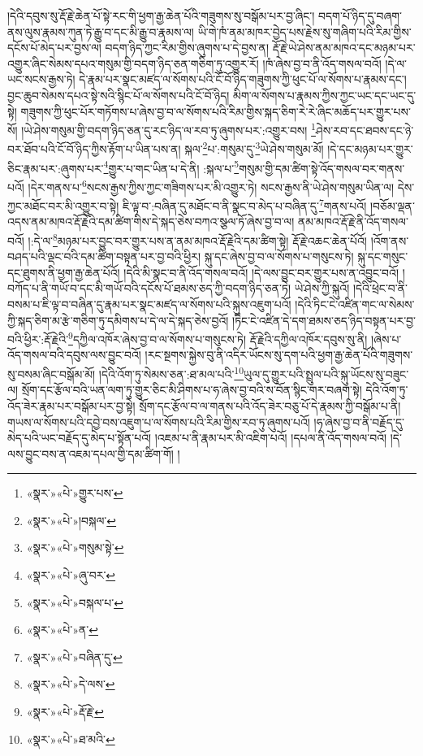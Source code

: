 །དེའི་དབུས་སུ་རྡོ་རྗེ་ཆེན་པོ་སྟེ་རང་གི་ཕྱག་རྒྱ་ཆེན་པོའི་གཟུགས་སུ་བསྒོམ་པར་བྱ་ཞིང་། བདག་པོ་ཉིད་དུ་བཞག་ནས་ལུས་རྣམས་ཀུན་ཏེ་རྒྱུ་བ་དང་མི་རྒྱུ་བ་རྣམས་ལ། ཡི་གེ་ཁཾ་ནམ་མཁར་བྱེད་པས་རྗེས་སུ་གཞིག་པའི་རིམ་གྱིས་དངོས་པོ་མེད་པར་བྱས་ལ། བདག་ཉིད་ཀྱང་རིམ་གྱིས་ཞུགས་པ་དེ་བྱས་ན། རྡོ་རྗེ་ཡེ་ཤེས་ནམ་མཁའ་དང་མཉམ་པར་འགྱུར་ཞིང་སེམས་དཔའ་གསུམ་གྱི་བདག་ཉིད་ཅན་གཅིག་ཏུ་འགྱུར་རོ། །ཁཾ་ཞེས་བྱ་བ་ནི་འོད་གསལ་བའོ། །དེ་ལ་ཡང་སངས་རྒྱས་ཏེ། དེ་རྣམ་པར་སྣང་མཛད་ལ་སོགས་པའི་ངོ་བོ་ཉིད་གཟུགས་ཀྱི་ཕུང་པོ་ལ་སོགས་པ་རྣམས་དང་། བྱང་ཆུབ་སེམས་དཔའ་སྟེ་སའི་སྙིང་པོ་ལ་སོགས་པའི་ངོ་བོ་ཉིད། མིག་ལ་སོགས་པ་རྣམས་ཀྱིས་ཀྱང་ཡང་དང་ཡང་དུ་སྟེ། གཟུགས་ཀྱི་ཕུང་པོར་གཏོགས་པ་ཞེས་བྱ་བ་ལ་སོགས་པའི་རིམ་གྱིས་སྐད་ཅིག་རེ་རེ་ཞིང་མཆོད་པར་གྱུར་པས་སོ། །ཡེ་ཤེས་གསུམ་གྱི་བདག་ཉིད་ཅན་དུ་རང་ཉིད་ལ་རབ་ཏུ་ཞུགས་པར་:འགྱུར་བས། \footnote{«སྣར་»«པེ་»གྱུར་པས་}ཤེས་རབ་དང་ཐབས་དང་ཉེ་བར་ཐོབ་པའི་ངོ་བོ་ཉིད་ཀྱིས་རྟོག་པ་ཡིན་པས་ན། སྐལ་\footnote{«སྣར་»«པེ་»།བསྐལ་}པ་:གསུམ་དུ་\footnote{«སྣར་»«པེ་»གསུམ་སྟེ་}ཡེ་ཤེས་གསུམ་མོ། །དེ་དང་མཉམ་པར་གྱུར་ཅིང་རྣམ་པར་:ཞུགས་པར་\footnote{«སྣར་»«པེ་»ཞུ་བར་}གྱུར་པ་གང་ཡིན་པ་དེ་ནི། :སྐལ་པ་\footnote{«སྣར་»«པེ་»བསྐལ་པ་}གསུམ་གྱི་དམ་ཚིག་སྟེ་འོད་གསལ་བར་གནས་པའོ། །དེར་གནས་པ་\footnote{«སྣར་»«པེ་»ན་}སངས་རྒྱས་ཀྱིས་ཀྱང་གཟིགས་པར་མི་འགྱུར་ཏེ། སངས་རྒྱས་ནི་ཡེ་ཤེས་གསུམ་ཡིན་ལ། དེས་ཀྱང་མཐོང་བར་མི་འགྱུར་བ་སྟེ། ཇི་ལྟ་བ་:བཞིན་དུ་མཐོང་བ་ནི་སྣང་བ་མེད་པ་བཞིན་དུ་\footnote{«སྣར་»«པེ་»བཞིན་དུ་}གནས་པའོ། །བཅོམ་ལྡན་འདས་ནམ་མཁའ་རྡོ་རྗེའི་དམ་ཚིག་གིས་དེ་སྐད་ཅེས་བཀའ་སྩལ་ཏོ་ཞེས་བྱ་བ་ལ། ནམ་མཁའ་རྡོ་རྗེ་ནི་འོད་གསལ་བའོ། །:དེ་ལ་\footnote{«སྣར་»«པེ་»དེ་ལས་}མཉམ་པར་བྱུང་བར་གྱུར་པས་ན་ནམ་མཁའ་རྡོ་རྗེའི་དམ་ཚིག་སྟེ། རྡོ་རྗེ་འཆང་ཆེན་པོའོ། །འོག་ནས་བཤད་པའི་ལྡང་བའི་དམ་ཚིག་བསྟན་པར་བྱ་བའི་ཕྱིར། སྐུ་དང་ཞེས་བྱ་བ་ལ་སོགས་པ་གསུངས་ཏེ། སྐུ་དང་གསུང་དང་ཐུགས་ནི་ཕྱག་རྒྱ་ཆེན་པོའོ། །དེའི་མི་སྣང་བ་ནི་འོད་གསལ་བའོ། །དེ་ལས་བྱུང་བར་གྱུར་པས་ན་འབྱུང་བའོ། །བཀོད་པ་ནི་གཡོ་བ་དང་མི་གཡོ་བའི་དངོས་པོ་ཐམས་ཅད་ཀྱི་བདག་ཉིད་ཅན་ཏེ། ཡེ་ཤེས་ཀྱི་སྐུའོ། །དེའི་ཕྲེང་བ་ནི་བསམ་པ་ཇི་ལྟ་བ་བཞིན་དུ་རྣམ་པར་སྣང་མཛད་ལ་སོགས་པའི་སྐུས་འཇུག་པའོ། །དེའི་ཏིང་ངེ་འཛིན་གང་ལ་སེམས་ཀྱི་སྐད་ཅིག་མ་རྩེ་གཅིག་ཏུ་དམིགས་པ་དེ་ལ་དེ་སྐད་ཅེས་བྱའོ། །ཏིང་ངེ་འཛིན་དེ་དག་ཐམས་ཅད་ཉིད་བསྟན་པར་བྱ་བའི་ཕྱིར་:རྡོ་རྗེའི་\footnote{«སྣར་»«པེ་»རྡོ་རྗེ་}དཀྱིལ་འཁོར་ཞེས་བྱ་བ་ལ་སོགས་པ་གསུངས་ཏེ། རྡོ་རྗེའི་དཀྱིལ་འཁོར་དབུས་སུ་ནི། །ཞེས་པ་འོད་གསལ་བའི་དབུས་ལས་བྱུང་བའོ། །རང་སྔགས་སྐྱེས་བུ་ནི་འདིར་ཡོངས་སུ་དག་པའི་ཕྱག་རྒྱ་ཆེན་པོའི་གཟུགས་སུ་བསམ་ཞིང་བསྒོམ་མོ། །དེའི་འོག་ཏུ་སེམས་ཅན་:ཐ་མལ་པའི་\footnote{«སྣར་»«པེ་»ཐ་མའི་}ཡུལ་དུ་གྱུར་པའི་སྤྲུལ་པའི་སྐུ་ཡོངས་སུ་བཟུང་ལ། སྲོག་དང་རྩོལ་བའི་ཡན་ལག་ཏུ་གྱུར་ཅིང་མི་ཤིགས་པ་ཧ་ཞེས་བྱ་བའི་ས་བོན་སྙིང་གར་བཞག་སྟེ། དེའི་འོག་ཏུ་འོད་ཟེར་རྣམ་པར་བསྒོམ་པར་བྱ་སྟེ། སྲོག་དང་རྩོལ་བ་ལ་གནས་པའི་འོད་ཟེར་བཅུ་པོ་དེ་རྣམས་ཀྱི་བསྒོམ་པ་ནི། གཡས་ལ་སོགས་པའི་དབྱེ་བས་འཇུག་པ་ལ་སོགས་པའི་རིམ་གྱིས་རབ་ཏུ་ཞུགས་པའོ། །ཧ་ཞེས་བྱ་བ་ནི་བརྗོད་དུ་མེད་པའི་ཡང་བརྗོད་དུ་མེད་པ་སྟོན་པའོ། །འཇམ་པ་ནི་རྣམ་པར་མི་འཇིག་པའོ། །དཔལ་ནི་འོད་གསལ་བའོ། །དེ་ལས་བྱུང་བས་ན་འཇམ་དཔལ་གྱི་དམ་ཚིག་གོ། །
